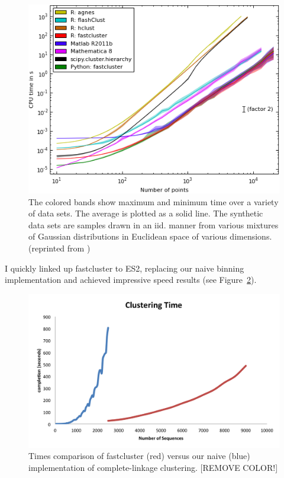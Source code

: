 \begin{figure}[h!]
\centering
\includegraphics[scale=0.75]{images/FastComplete-CH3}
\caption[Complete linkage clustering speed comparison between popular implementations.]{The colored bands show maximum and minimum time over a variety of data sets. The average is plotted as a solid line. The synthetic data sets are samples drawn in an iid. manner from various mixtures of Gaussian distributions in Euclidean space of various dimensions.
(reprinted from \protect\cite{FastClust})}
\label{fig:FastClustComparison}
\end{figure}

I quickly linked up fastcluster to ES2, replacing our naive binning implementation and achieved impressive speed results (see Figure~\ref{fig:FastVsNaive}).

\begin{figure}[h!]
\centering
\includegraphics[scale=.8]{images/FastVsNaive-CH3}
\caption[Time comparison of fastcluster versus our naive implementation of complete-linkage clustering.]{Times comparison of fastcluster (red) versus our naive (blue) implementation of complete-linkage clustering. [REMOVE COLOR!]}
\label{fig:FastVsNaive}
\end{figure}

